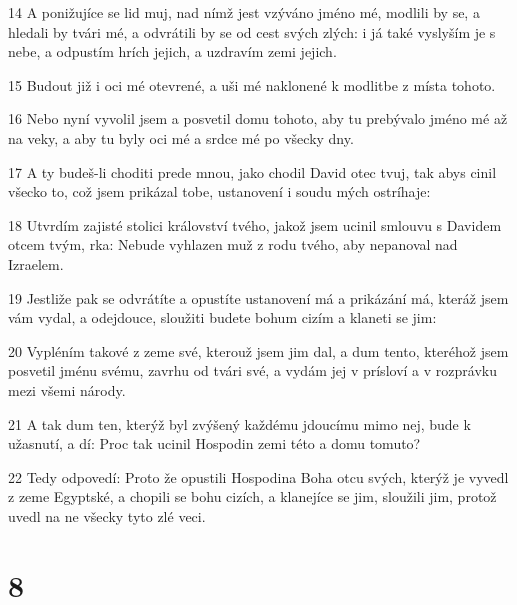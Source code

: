 \par 14 A ponižujíce se lid muj, nad nímž jest vzýváno jméno mé, modlili by se, a hledali by tvári mé, a odvrátili by se od cest svých zlých: i já také vyslyším je s nebe, a odpustím hrích jejich, a uzdravím zemi jejich.
\par 15 Budout již i oci mé otevrené, a uši mé naklonené k modlitbe z místa tohoto.
\par 16 Nebo nyní vyvolil jsem a posvetil domu tohoto, aby tu prebývalo jméno mé až na veky, a aby tu byly oci mé a srdce mé po všecky dny.
\par 17 A ty budeš-li choditi prede mnou, jako chodil David otec tvuj, tak abys cinil všecko to, což jsem prikázal tobe, ustanovení i soudu mých ostríhaje:
\par 18 Utvrdím zajisté stolici království tvého, jakož jsem ucinil smlouvu s Davidem otcem tvým, rka: Nebude vyhlazen muž z rodu tvého, aby nepanoval nad Izraelem.
\par 19 Jestliže pak se odvrátíte a opustíte ustanovení má a prikázání má, kteráž jsem vám vydal, a odejdouce, sloužiti budete bohum cizím a klaneti se jim:
\par 20 Vypléním takové z zeme své, kterouž jsem jim dal, a dum tento, kteréhož jsem posvetil jménu svému, zavrhu od tvári své, a vydám jej v prísloví a v rozprávku mezi všemi národy.
\par 21 A tak dum ten, kterýž byl zvýšený každému jdoucímu mimo nej, bude k užasnutí, a dí: Proc tak ucinil Hospodin zemi této a domu tomuto?
\par 22 Tedy odpovedí: Proto že opustili Hospodina Boha otcu svých, kterýž je vyvedl z zeme Egyptské, a chopili se bohu cizích, a klanejíce se jim, sloužili jim, protož uvedl na ne všecky tyto zlé veci.

\chapter{8}

